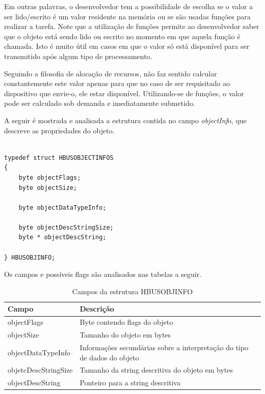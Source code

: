 \documentclass[11pt]{report}
\begin{document}
Em outras palavras, o desenvolvedor tem a possibilidade de escolha se o valor a ser lido/escrito é um valor residente na memória ou se são usadas funções para realizar a tarefa. Note que a utilização de funções permite ao desenvolvedor saber que o objeto está sendo lido ou escrito no momento em que aquela função é chamada. Isto é muito útil em casos em que o valor só está disponível para ser transmitido após algum tipo de processamento.

Seguindo a filosofia de alocação de recursos, não faz sentido calcular constantemente este valor apenas para que no caso de ser requisitado ao dispositivo que envie-o, ele estar disponível. Utilizando-se de funções, o valor pode ser calculado sob demanda e imediatamente submetido.

\vskip1cm

A seguir é mostrada e analisada a estrutura contida no campo \textit{objectInf}o, que descreve as propriedades do objeto.

\pagebreak

\begin{verbatim}

typedef struct HBUSOBJECTINFOS
{
	byte objectFlags;
	byte objectSize;
	
	byte objectDataTypeInfo;
	
	byte objectDescStringSize;
	byte * objectDescString;
	
} HBUSOBJINFO;

\end{verbatim}

Os campos e possíveis flags são analisados nas tabelas a seguir.

\begin{table}[H]
\centering
\caption{Campos da estrutura HBUSOBJINFO}
\begin{tabular}{l p{10cm}}

\hline
Campo					&	Descrição\\
\hline
objectFlags				&	Byte contendo flags do objeto\\
objectSize				&	Tamanho do objeto em bytes\\
objectDataTypeInfo		&	Informações secundárias sobre a interpretação do tipo de dados do objeto\\
objetcDescStringSize		&	Tamanho da string descritiva do objeto em bytes\\
objectDescString			&	Ponteiro para a string descritiva\\
\hline

\end{tabular}
\end{table}
\end{document}
